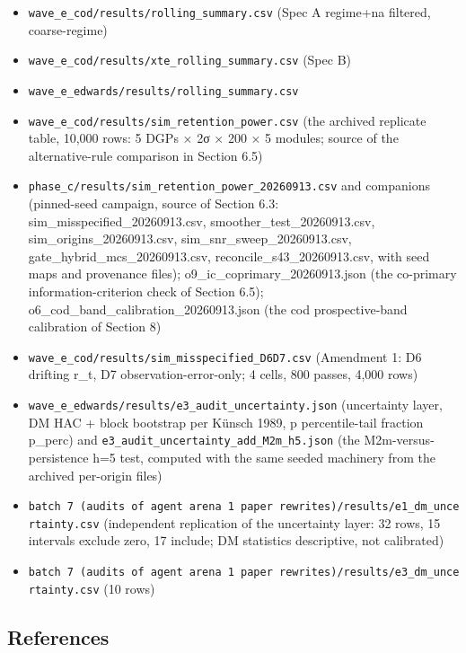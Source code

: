 \documentclass[11pt]{article}
\providecommand{\tightlist}{\setlength{\itemsep}{0.2em}\setlength{\parskip}{0pt}}
\begin{document}
\begin{itemize}
\tightlist
\item
  \texttt{wave\_e\_cod/results/rolling\_summary.csv} (Spec A regime+na
  filtered, coarse-regime)
\item
  \texttt{wave\_e\_cod/results/xte\_rolling\_summary.csv} (Spec B)
\item
  \texttt{wave\_e\_edwards/results/rolling\_summary.csv}
\item
  \texttt{wave\_e\_cod/results/sim\_retention\_power.csv} (the archived
  replicate table, 10,000 rows: 5 DGPs × 2σ × 200 × 5 modules; source of
  the alternative-rule comparison in Section 6.5)
\item
  \texttt{phase\_c/results/sim\_retention\_power\_20260913.csv} and
  companions (pinned-seed campaign, source of Section 6.3:
  sim\_misspecified\_20260913.csv, smoother\_test\_20260913.csv,
  sim\_origins\_20260913.csv, sim\_snr\_sweep\_20260913.csv,
  gate\_hybrid\_mcs\_20260913.csv, reconcile\_s43\_20260913.csv, with
  seed maps and provenance files); o9\_ic\_coprimary\_20260913.json (the
  co-primary information-criterion check of Section 6.5);
  o6\_cod\_band\_calibration\_20260913.json (the cod prospective-band
  calibration of Section 8)
\item
  \texttt{wave\_e\_cod/results/sim\_misspecified\_D6D7.csv} (Amendment
  1: D6 drifting r\_t, D7 observation-error-only; 4 cells, 800 passes,
  4,000 rows)
\item
  \texttt{wave\_e\_edwards/results/e3\_audit\_uncertainty.json}
  (uncertainty layer, DM HAC + block bootstrap per Künsch 1989, p
  percentile-tail fraction p\_perc) and
  \texttt{e3\_audit\_uncertainty\_add\_M2m\_h5.json} (the
  M2m-versus-persistence h=5 test, computed with the same seeded
  machinery from the archived per-origin files)
\item
  \texttt{batch\ 7\ (audits\ of\ agent\ arena\ 1\ paper\ rewrites)/results/e1\_dm\_uncertainty.csv}
  (independent replication of the uncertainty layer: 32 rows, 15
  intervals exclude zero, 17 include; DM statistics descriptive, not
  calibrated)
\item
  \texttt{batch\ 7\ (audits\ of\ agent\ arena\ 1\ paper\ rewrites)/results/e3\_dm\_uncertainty.csv}
  (10 rows)
\end{itemize}

\subsection{References}\label{references}
\end{document}
